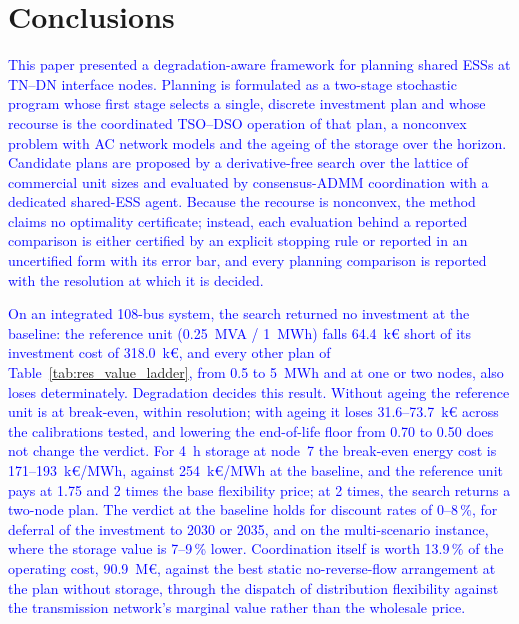 \documentclass[preprint,12pt]{elsarticle}
\begin{document}
\section{Conclusions}
\label{sec:conclusions}

\textcolor{blue}{
    This paper presented a degradation-aware framework for planning shared ESSs at TN--DN interface nodes. Planning is formulated as a two-stage stochastic program whose first stage selects a single, discrete investment plan and whose recourse is the coordinated TSO--DSO operation of that plan, a nonconvex problem with AC network models and the ageing of the storage over the horizon. Candidate plans are proposed by a derivative-free search over the lattice of commercial unit sizes and evaluated by consensus-ADMM coordination with a dedicated shared-ESS agent. Because the recourse is nonconvex, the method claims no optimality certificate; instead, each evaluation behind a reported comparison is either certified by an explicit stopping rule or reported in an uncertified form with its error bar, and every planning comparison is reported with the resolution at which it is decided.
}

\textcolor{blue}{
    On an integrated 108-bus system, the search returned no investment at the baseline: the reference unit (0.25~MVA / 1~MWh) falls 64.4~k\euro{} short of its investment cost of 318.0~k\euro{}, and every other plan of Table~\ref{tab:res_value_ladder}, from 0.5 to 5~MWh and at one or two nodes, also loses determinately. Degradation decides this result. Without ageing the reference unit is at break-even, within resolution; with ageing it loses 31.6--73.7~k\euro{} across the calibrations tested, and lowering the end-of-life floor from 0.70 to 0.50 does not change the verdict. For 4~h storage at node~7 the break-even energy cost is 171--193~k\euro/MWh, against 254~k\euro/MWh at the baseline, and the reference unit pays at 1.75 and 2 times the base flexibility price; at 2 times, the search returns a two-node plan. The verdict at the baseline holds for discount rates of 0--8\,\%, for deferral of the investment to 2030 or 2035, and on the multi-scenario instance, where the storage value is 7--9\,\% lower. Coordination itself is worth 13.9\,\% of the operating cost, 90.9~M\euro{}, against the best static no-reverse-flow arrangement at the plan without storage, through the dispatch of distribution flexibility against the transmission network's marginal value rather than the wholesale price.
}
\end{document}

